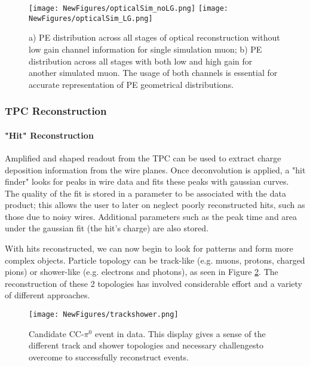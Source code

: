 \documentclass[12pt]{article}
\begin{document}
\begin{figure}[h!]
\centering
\texttt{[image: NewFigures/opticalSim\_noLG.png]}
\hspace{2 mm}
\texttt{[image: NewFigures/opticalSim\_LG.png]}
\caption{a) PE distribution across all stages of optical reconstruction without low gain channel information for single simulation muon; b) PE distribution across all stages with both low and high gain for another simulated muon. The usage of both channels is essential for accurate representation of PE geometrical distributions. }
\label{fig:pedistrib}
\end{figure}

\subsubsection{TPC Reconstruction}
\paragraph{"Hit" Reconstruction}
Amplified and shaped readout from the TPC can be used to extract charge deposition information from the wire planes.  Once deconvolution is applied, a "hit finder" looks for peaks in wire data and fits these peaks with gaussian curves.  The quality of the fit is stored in a parameter to be associated with the data product; this allows the user to later on neglect poorly reconstructed hits, such as those due to noisy wires.  Additional parameters such as the peak time and area under the gaussian fit (the hit's charge) are also stored.  

\par With hits reconstructed, we can now begin to look for patterns and form more complex objects. Particle topology can be track-like (e.g. muons, protons, charged pions) or shower-like (e.g. electrons and photons), as seen in Figure \ref{fig:trackshower}. The reconstruction of these 2 topologies has involved considerable effort and a variety of different approaches.  

\begin{figure}[h!]
\centering
\texttt{[image: NewFigures/trackshower.png]}
\caption{Candidate CC-$\pi^0$ event in data. This display gives a sense of the different track and shower topologies and necessary challengesto overcome to successfully reconstruct events.} 
\label{fig:trackshower}
\end{figure}
\end{document}
